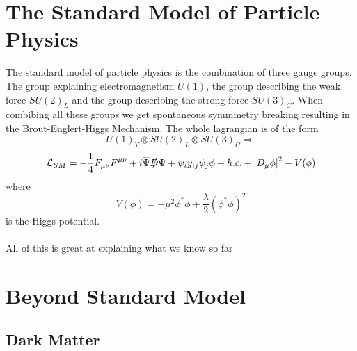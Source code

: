 \documentclass[14pt, a4paper]{book}
\begin{document}
\section{The Standard Model of Particle Physics}
The standard model of particle physics is the combination of three gauge groups. The group explaining electromagnetism $U(1)$, the group describing the weak force $SU(2)_L$ and the group describing the strong force $SU(3)_C$. 
When combibing all these groups we get spontaneous symmmetry breaking resulting in the Brout-Englert-Higgs Mechanism. The whole lagrangian is of the form
$$
U(1)_Y\otimes SU(2)_L\otimes SU(3)_C \Rightarrow 
$$
\begin{equation}
    \mathcal{L}_{SM} = -\frac{1}{4}F_{\mu\nu}F^{\mu\nu} + i\overline{\Psi}\slashed{D}\Psi + \psi_iy_{ij}\psi_j\phi + h.c. + \abs{D_\mu\phi}^2 - V(\phi)
\end{equation}
where 
$$
V(\phi)=-\mu^2\phi^*\phi + \frac{\lambda}{2}(\phi^*\phi)^2
$$
is the Higgs potential.\\
\\All of this is great at explaining what we know so far


\section{Beyond Standard Model}

\subsection{Dark Matter}
\end{document}
